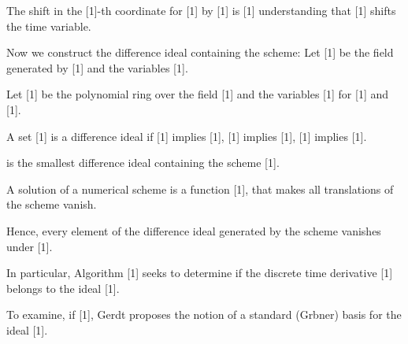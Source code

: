 \documentclass{amsart}
\begin{document}
\noindent   The shift in the [1]-th coordinate for [1] by [1] is [1] understanding that [1] shifts the time variable.

\noindent  

\noindent {\color{green} ********************}



\noindent {\color{green} ********************}

\noindent  Now we construct the difference ideal containing the scheme: Let [1] be the field generated by [1] and the variables [1].

\noindent   Let [1] be the polynomial ring over the field [1] and the variables [1] for [1] and [1].

\noindent   A set [1] is a difference ideal if [1] implies [1], [1] implies [1], [1] implies [1].

\noindent   [1] is the smallest difference ideal containing the scheme [1].

\noindent   A solution of a numerical scheme is a function [1], that makes all translations of the scheme vanish.

\noindent   Hence, every element of the difference ideal generated by the scheme vanishes under [1].

\noindent   In particular, Algorithm [1] seeks to determine if the discrete time derivative [1] belongs to the ideal [1].

\noindent   To examine, if [1], Gerdt proposes the notion of a standard (Grbner) basis for the ideal [1].

\noindent  

\noindent {\color{green} ********************}



\noindent {\color{green} ********************}

\noindent 

\noindent {\color{green} ********************}


\end{document}
